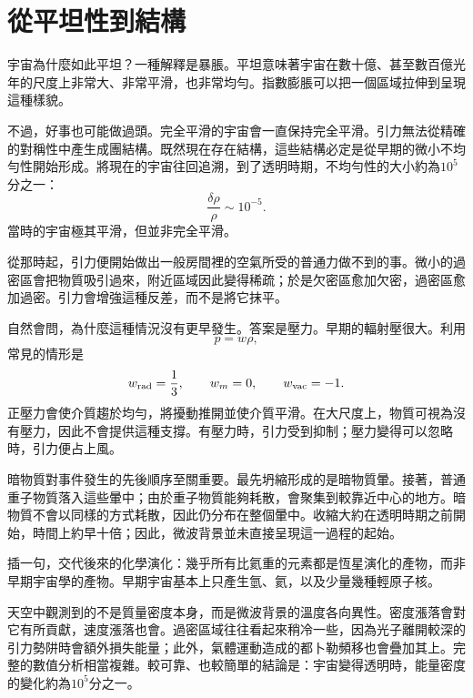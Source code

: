 \begin{classroomqa}
\end{classroomqa}

\section{從平坦性到結構}

宇宙為什麼如此平坦？一種解釋是暴脹。平坦意味著宇宙在數十億、甚至數百億光年的尺度上非常大、非常平滑，也非常均勻。指數膨脹可以把一個區域拉伸到呈現這種樣貌。

不過，好事也可能做過頭。完全平滑的宇宙會一直保持完全平滑。引力無法從精確的對稱性中產生成團結構。既然現在存在結構，這些結構必定是從早期的微小不均勻性開始形成。將現在的宇宙往回追溯，到了透明時期，不均勻性的大小約為\(10^5\)分之一：
\begin{equation}
\frac{\delta\rho}{\rho}\sim 10^{-5}.
\end{equation}
當時的宇宙極其平滑，但並非完全平滑。

從那時起，引力便開始做出一般房間裡的空氣所受的普通力做不到的事。微小的過密區會把物質吸引過來，附近區域因此變得稀疏；於是欠密區愈加欠密，過密區愈加過密。引力會增強這種反差，而不是將它抹平。

自然會問，為什麼這種情況沒有更早發生。答案是壓力。早期的輻射壓很大。利用
\begin{equation}
p=w\rho,
\end{equation}
常見的情形是
\begin{equation}
w_{\rm rad}=\frac13,\qquad
w_m=0,\qquad
w_{\rm vac}=-1.
\end{equation}
正壓力會使介質趨於均勻，將擾動推開並使介質平滑。在大尺度上，物質可視為沒有壓力，因此不會提供這種支撐。有壓力時，引力受到抑制；壓力變得可以忽略時，引力便占上風。

暗物質對事件發生的先後順序至關重要。最先坍縮形成的是暗物質暈。接著，普通重子物質落入這些暈中；由於重子物質能夠耗散，會聚集到較靠近中心的地方。暗物質不會以同樣的方式耗散，因此仍分布在整個暈中。收縮大約在透明時期之前開始，時間上約早十倍；因此，微波背景並未直接呈現這一過程的起始。

插一句，交代後來的化學演化：幾乎所有比氦重的元素都是恆星演化的產物，而非早期宇宙學的產物。早期宇宙基本上只產生氫、氦，以及少量幾種輕原子核。

天空中觀測到的不是質量密度本身，而是微波背景的溫度各向異性。密度漲落會對它有所貢獻，速度漲落也會。過密區域往往看起來稍冷一些，因為光子離開較深的引力勢阱時會額外損失能量；此外，氣體運動造成的都卜勒頻移也會疊加其上。完整的數值分析相當複雜。較可靠、也較簡單的結論是：宇宙變得透明時，能量密度的變化約為\(10^5\)分之一。

